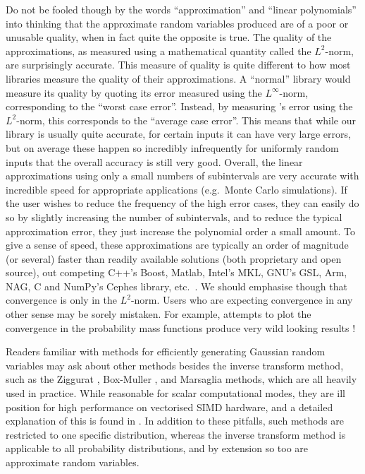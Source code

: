 Do not be fooled though by the words ``approximation'' and ``linear polynomials'' into thinking that the approximate random variables produced are of a poor or unusable quality, when in fact quite the opposite is true. The quality of the approximations, as measured using a mathematical quantity called the \( L^2 \)-norm, are surprisingly accurate. This measure of quality is quite different to how most libraries measure the quality of their approximations. A ``normal'' library would measure its quality by quoting its error measured using the \( L^\infty \)-norm, corresponding to the ``worst case error''. Instead, by measuring \arv's error using the \( L^2 \)-norm, this corresponds to the ``average case error''. This means that while our library is usually quite accurate, for certain inputs it can have very large errors, but on average these happen so incredibly infrequently for uniformly random inputs that the overall accuracy is still very good. Overall, the linear approximations using only a small numbers of subintervals are very accurate with incredible speed for appropriate applications (e.g.\ Monte Carlo simulations).  If the user wishes to reduce the frequency of the high error cases, they can easily do so by slightly increasing the number of subintervals, and to reduce the typical approximation error, they just increase the polynomial order a small amount. To give a sense of speed, these approximations are typically an order of magnitude (or several) faster than readily available solutions (both proprietary and open source), out competing C++'s Boost, Matlab, Intel's MKL, GNU's GSL, Arm, NAG, C and NumPy's Cephes library, etc.\ \citep[\S\,3.4]{giles2023approximating}. We should emphasise though that convergence is only in the \( L^2 \)-norm. Users who are expecting convergence in any other sense may be sorely mistaken. For example, attempts to plot the convergence in the probability mass functions produce very wild looking results \citep[fig.\,2.1b]{giles2024rounding}!

Readers familiar with methods for efficiently generating Gaussian random variables may ask about other methods besides the inverse transform method, such as the Ziggurat \citep{marsaglia2000ziggurat}, Box-Muller \citep{box1958note}, and Marsaglia \citep{marsaglia1964convenient} methods, which are all heavily used in practice. While reasonable for scalar computational modes, they are ill position for high performance on vectorised SIMD hardware, and a detailed explanation of this is found in \citep[\S\,3.1.1]{giles2023approximating}. In addition to these pitfalls, such methods are restricted to one specific distribution, whereas the inverse transform method is applicable to all probability distributions, and by extension so too are approximate random variables.

